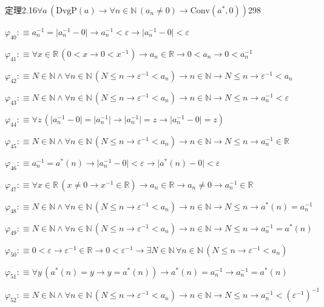 \begin{fullproof}{定理2.16}{$\forall a\,(\mathrm{DvgP}(a) \to \forall n \in \mathbb{N}\,(a_{n} \neq 0) \to \mathrm{Conv}(a^{\ast},0))$}{298}
\begin{abbrevlist}
\item $\varphi_{40} :\equiv a_{n}^{-1} = \lvert a_{n}^{-1} - 0 \rvert \to a_{n}^{-1} < \varepsilon \to \lvert a_{n}^{-1} - 0 \rvert < \varepsilon$
\item $\varphi_{41} :\equiv \forall x \in \mathbb{R}\,(0 < x \to 0 < x^{-1}) \to a_{n} \in \mathbb{R} \to 0 < a_{n} \to 0 < a_{n}^{-1}$
\item $\varphi_{42} :\equiv N \in \mathbb{N} \land \forall n \in \mathbb{N}\,(N \leq n \to \varepsilon^{-1} < a_{n}) \to n \in \mathbb{N} \to N \leq n \to \varepsilon^{-1} < a_{n}$
\item $\varphi_{43} :\equiv N \in \mathbb{N} \land \forall n \in \mathbb{N}\,(N \leq n \to \varepsilon^{-1} < a_{n}) \to n \in \mathbb{N} \to N \leq n \to a_{n}^{-1} < \varepsilon$
\item $\varphi_{44} :\equiv \forall z\,(\lvert a_{n}^{-1} - 0 \rvert = \lvert a_{n}^{-1} \rvert \to \lvert a_{n}^{-1} \rvert = z \to \lvert a_{n}^{-1} - 0 \rvert = z)$
\item $\varphi_{45} :\equiv N \in \mathbb{N} \land \forall n \in \mathbb{N}\,(N \leq n \to \varepsilon^{-1} < a_{n}) \to n \in \mathbb{N} \to N \leq n \to a_{n}^{-1} \in \mathbb{R}$
\item $\varphi_{46} :\equiv a_{n}^{-1} = a^{\ast}(n) \to \lvert a_{n}^{-1} - 0 \rvert < \varepsilon \to \lvert a^{\ast}(n) - 0 \rvert < \varepsilon$
\item $\varphi_{47} :\equiv \forall x \in \mathbb{R}\,(x \neq 0 \to x^{-1} \in \mathbb{R}) \to a_{n} \in \mathbb{R} \to a_{n} \neq 0 \to a_{n}^{-1} \in \mathbb{R}$
\item $\varphi_{48} :\equiv N \in \mathbb{N} \land \forall n \in \mathbb{N}\,(N \leq n \to \varepsilon^{-1} < a_{n}) \to n \in \mathbb{N} \to N \leq n \to a^{\ast}(n) = a_{n}^{-1}$
\item $\varphi_{49} :\equiv N \in \mathbb{N} \land \forall n \in \mathbb{N}\,(N \leq n \to \varepsilon^{-1} < a_{n}) \to n \in \mathbb{N} \to N \leq n \to a_{n}^{-1} = a^{\ast}(n)$
\item $\varphi_{50} :\equiv 0 < \varepsilon \to \varepsilon^{-1} \in \mathbb{R} \to 0 < \varepsilon^{-1} \to \exists N \in \mathbb{N}\,\forall n \in \mathbb{N}\,(N \leq n \to \varepsilon^{-1} < a_{n})$
\item $\varphi_{51} :\equiv \forall y\,(a^{\ast}(n) = y \to y = a^{\ast}(n)) \to a^{\ast}(n) = a_{n}^{-1} \to a_{n}^{-1} = a^{\ast}(n)$
\item $\varphi_{52} :\equiv N \in \mathbb{N} \land \forall n \in \mathbb{N}\,(N \leq n \to \varepsilon^{-1} < a_{n}) \to n \in \mathbb{N} \to N \leq n \to a_{n}^{-1} < (\varepsilon^{-1})^{-1}$

\end{abbrevlist}
\end{fullproof}
